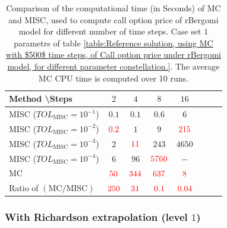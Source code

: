\begin{table}[h!]
	\centering
	\begin{tabular}{l*{6}{c}r}
		Method \textbackslash  Steps            & $2$ & $4$ & $8$ & $16$ &   \\
		\hline
		MISC ($TOL_{\text{MISC}}=10^{-1}$)  & $0.1$ & $0.1$ & $0.6$ & $6$  \\
		MISC ($TOL_{\text{MISC}}=10^{-2}$)  & ${\color{red}0.2}$ & $1$ & $9$ & ${\color{red}215}$  \\
		MISC ($TOL_{\text{MISC}}=10^{-3}$)  & $2$ & ${\color{red}11}$ & $243$ & $4650$  \\
		MISC ($TOL_{\text{MISC}}=10^{-4}$)  & $6$ & $96$ & ${\color{red}5760}$ & $-$  \\
		\hline
		MC     & ${\color{red} 50}$  & ${\color{red}344}$  & ${\color{red}637}$ & ${\color{red}8}$  \\
		
		\hline
		Ratio of $\left(\text{MC}/ \text{MISC} \right)$  &${\color{red}  250}$ & ${\color{red}    31
		}$  & ${\color{red} 0.1
		}$  & ${\color{red}  0.04}$ \\
		\hline
	\end{tabular}
	\caption{Comparison of the computational time (in Seconds) of  MC and MISC, used to compute call option price of rBergomi model for different number of time steps. Case set $1$ parametrs of table \ref{table:Reference solution, using MC with $500$ time steps, of Call option price under rBergomi model, for different parameter constellation.}. The
		average MC CPU time is computed over 10 runs. }
	\label{Comparison of the computational time of  MC and MISC, used to compute Call option price of rBergomi model for different number of time steps. Case set1}
\end{table}

\subsubsection*{With Richardson extrapolation (level $1$)}







